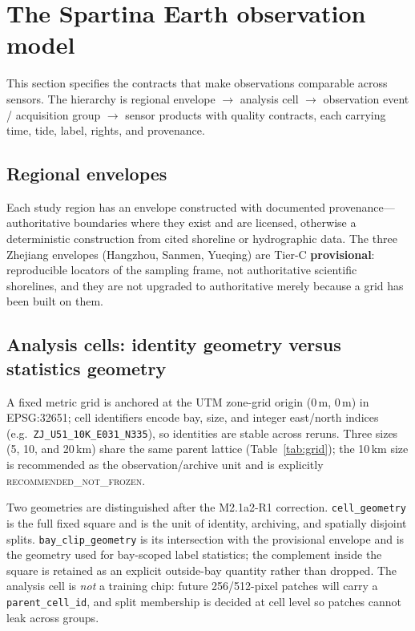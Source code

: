 \section{The Spartina Earth observation model}\label{sec:model}

This section specifies the contracts that make observations comparable
across sensors. The hierarchy is regional envelope $\rightarrow$
analysis cell $\rightarrow$ observation event / acquisition group
$\rightarrow$ sensor products with quality contracts, each carrying
time, tide, label, rights, and provenance.

\subsection{Regional envelopes}
Each study region has an envelope constructed with documented
provenance---authoritative boundaries where they exist and are
licensed, otherwise a deterministic construction from cited shoreline
or hydrographic data. The three Zhejiang envelopes (Hangzhou, Sanmen,
Yueqing) are Tier-C \textbf{provisional}: reproducible locators of the
sampling frame, not authoritative scientific shorelines, and they are
not upgraded to authoritative merely because a grid has been built on
them.

\subsection{Analysis cells: identity geometry versus statistics geometry}
A fixed metric grid is anchored at the UTM zone-grid origin
(0\,m, 0\,m) in EPSG:32651; cell identifiers encode bay, size, and
integer east/north indices (e.g.\ \texttt{ZJ\_U51\_10K\_E031\_N335}),
so identities are stable across reruns. Three sizes (5, 10, and
20\,km) share the same parent lattice (Table~\ref{tab:grid}); the
10\,km size is recommended as the observation/archive unit and is
explicitly \textsc{recommended\_not\_frozen}.

Two geometries are distinguished after the M2.1a2-R1 correction.
\texttt{cell\_geometry} is the full fixed square and is the unit of
identity, archiving, and spatially disjoint splits.
\texttt{bay\_clip\_geometry} is its intersection with the provisional
envelope and is the geometry used for bay-scoped label statistics; the
complement inside the square is retained as an explicit
outside-bay quantity rather than dropped. The analysis cell is
\emph{not} a training chip: future 256/512-pixel patches will carry a
\texttt{parent\_cell\_id}, and split membership is decided at cell
level so patches cannot leak across groups.

